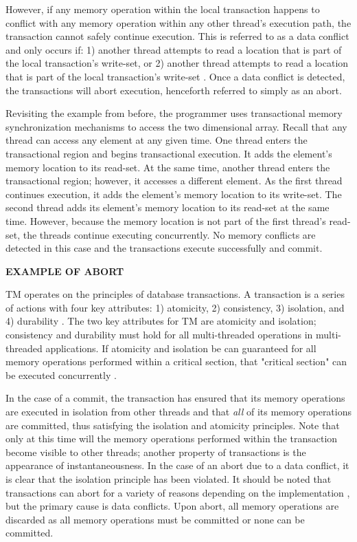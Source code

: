 \documentclass[a4paper]{article}
\begin{document}
\indent 
However, if any memory operation within the local transaction happens to  
conflict with any memory operation within any other thread's execution path, the
transaction cannot safely continue execution.  This is referred to as a data
conflict and only occurs if: 1) another thread attempts to read a location that
is part of the local transaction's write-set, or 2) another thread attempts to
read a location that is part of the local transaction's write-set
\cite{intel_prog_ref}.  Once a data conflict is detected, the transactions will
abort execution, henceforth referred to simply as an abort.
\par

\indent
Revisiting the example from before, the programmer uses transactional memory
synchronization mechanisms to access the two dimensional array.  Recall that any
thread can access any element at any given time.  One thread enters the
transactional region and begins transactional execution.  It adds the element's 
memory location to its read-set.  At the same time, another thread enters the
transactional region; however, it accesses a different element.  As the first
thread continues execution, it adds the element's memory location to its write-set.
The second thread adds its element's memory location to its read-set at the same
time.  However, because the memory location is not part of the first thread's
read-set, the threads continue executing concurrently.  No memory conflicts are
detected in this case and the transactions execute successfully and commit.
\par

\indent
\textbf{EXAMPLE OF ABORT}
\par

\indent 
TM operates on the principles of database transactions.  A transaction
is a series of actions with four key attributes: 1) atomicity, 2) consistency,
3) isolation, and 4) durability \cite{tm_2nd}.  The two key attributes for TM
are atomicity and isolation; consistency and durability must hold for all
multi-threaded operations in multi-threaded applications.  If atomicity and
isolation be can guaranteed for all memory operations performed within a
critical section, that "critical section" can be executed concurrently
\cite{sle_rajwar}.
\par 

\indent 
In the case of a commit, the transaction has ensured that its memory
operations are executed in isolation from other threads and that \textit{all} of its
memory operations are committed, thus satisfying the isolation and
atomicity principles.  Note that only at this time will the memory operations
performed within the transaction become visible to other threads; another
property of transactions is the appearance of instantaneousness.  In the case
of an abort due to a data conflict, it is clear that the isolation principle has
been violated.  It should be noted that transactions can abort for a variety of
reasons depending on the implementation \cite{intel_opt_man,chung_amd}, but the
primary cause is data conflicts.  Upon abort, all memory operations are
discarded as all memory operations must be committed or none can be committed.
\par
\end{document}
